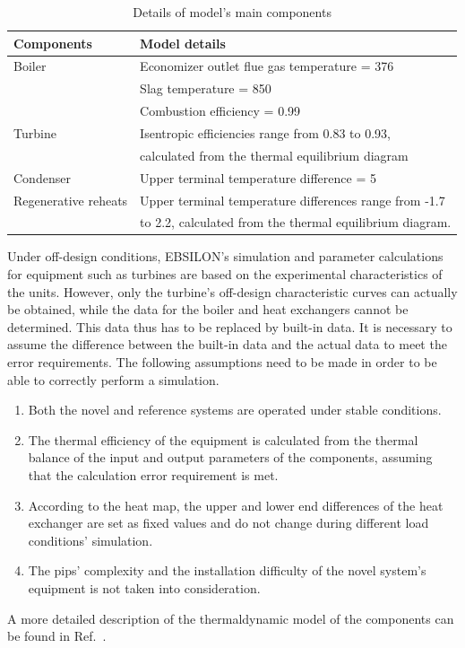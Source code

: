 \documentclass[preprint,12pt]{elsarticle}
\begin{document}
\begin{table}
\caption{Details of model's main components}
\label{table:model_details}
\begin{centering}
\begin{tabular}{ll}
\toprule 
Components 				& Model details\tabularnewline
\midrule
Boiler         			& Economizer outlet flue gas temperature = 376\textcelsius \tabularnewline
 						& Slag temperature = 850\textcelsius \tabularnewline
 						& Combustion efficiency = 0.99\tabularnewline
Turbine 				& Isentropic efficiencies range from 0.83 to 0.93, \tabularnewline
 						& calculated from the thermal equilibrium diagram\tabularnewline
Condenser 				& Upper terminal temperature difference = 5\textcelsius \tabularnewline
Regenerative reheats 	& Upper terminal temperature differences range from -1.7\textcelsius{}  \tabularnewline
 						& to 2.2\textcelsius, calculated from the thermal equilibrium diagram.\tabularnewline
\bottomrule
\end{tabular}
\par\end{centering}
\end{table}

Under off-design conditions, EBSILON's simulation and parameter calculations for equipment such as turbines are based on the experimental characteristics of the units.
However, only the turbine's off-design characteristic curves can actually be obtained, while the data for the boiler and heat exchangers cannot be determined.
This data thus has to be replaced by built-in data.
It is necessary to assume the difference between the built-in data and the actual data to meet the error requirements.
The following assumptions need to be made in order to be able to correctly perform a simulation.
\begin{enumerate}[(1)]
\item Both the novel and reference systems are operated under stable conditions.
\item The thermal efficiency of the equipment is calculated from the thermal balance of the input and output parameters of the components, assuming that the calculation error requirement is met.
\item According to the heat map, the upper and lower end differences of the heat exchanger are set as fixed values and do not change during different load conditions' simulation.
\item The pips' complexity and the installation difficulty of the novel system's equipment is not taken into consideration.
\end{enumerate}
A more detailed description of the thermaldynamic model of the components can be found in Ref.~\cite{Yao2017Multi}. %
\end{document}

